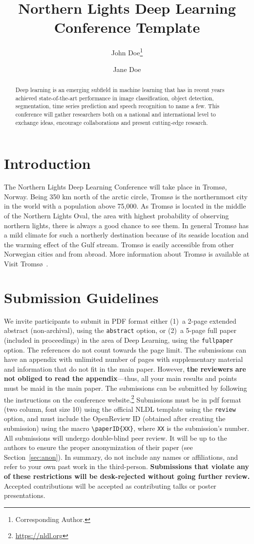 \documentclass[fullpaper]{nldl}
\title{Northern Lights Deep Learning Conference Template}
\author[1]{John Doe\thanks{Corresponding Author.}}
\author[1,2]{Jane Doe}
\affil[1]{Affiliation 1}
\affil[2]{Affiliation 2}
\affil[ ]{\texttt{\{john.doe, jane.doe\}@affiliation.com}}
\begin{document}
\maketitle

\begin{abstract}
Deep learning is an emerging subfield in machine learning that has in recent years achieved state-of-the-art performance in image classification, object detection, segmentation, time series prediction and speech recognition to name a few.
This conference will gather researchers both on a national and international level to exchange ideas, encourage collaborations and present cutting-edge research.
\end{abstract}

\section{Introduction}
The Northern Lights Deep Learning Conference will take place in Troms{\o}, Norway.
Being 350 km north of the arctic circle, Troms{\o} is the northernmost city in the world with a population above 75,000.
As Troms{\o} is located in the middle of the Northern Lights Oval, the area with highest probability of observing northern lights, there is always a good chance to see them.
In general Troms{\o} has a mild climate for such a northerly destination because of its seaside location and the warming effect of the Gulf stream.
Troms{\o} is easily accessible from other Norwegian cities and from abroad.
More information about Troms{\o} is available at Visit Troms{\o}~\cite{tromso}.

\section{Submission Guidelines}
We invite participants to submit in PDF format either (1)~a 2-page extended abstract (non-archival), using the \verb|abstract| option, or (2)~a 5-page full paper (included in proceedings) in the area of Deep Learning, using the \verb|fullpaper| option.
The references do not count towards the page limit.
The submissions can have an appendix with unlimited number of pages with supplementary material and information that do not fit in the main paper.
However, \textbf{the reviewers are not obliged to read the appendix}---thus, all your main results and points must be maid in the main paper.
The submissions can be submitted by following the instructions on the conference website.\footnote{\url{https://nldl.org}}
Submissions must be in pdf format (two column, font size 10) using the official NLDL template using the \verb|review| option, and must include the OpenReview ID (obtained after creating the submission) using the macro \verb|\paperID{XX}|, where \verb|XX| is the submission's number.
All submissions will undergo double-blind peer review.
It will be up to the authors to ensure the proper anonymization of their paper (see Section~\ref{sec:anon}).
In summary, do not include any names or affiliations, and refer to your own past work in the third-person.
\textbf{Submissions that violate any of these restrictions will be desk-rejected without going further review.}
Accepted contributions will be accepted as contributing talks or poster presentations.
\end{document}
